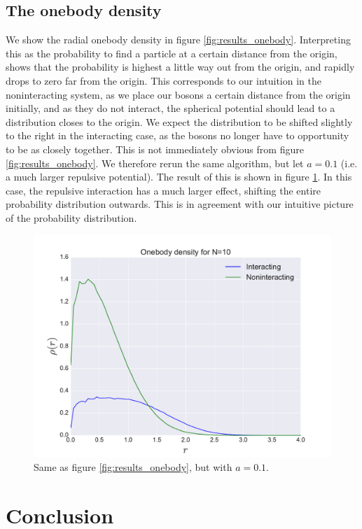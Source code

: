 \documentclass[a4paper, 10pt]{article}
\begin{document}
	 \subsection{The onebody density}\label{sec:Disc_onebody}
	 We show the radial onebody density in figure \ref{fig:results_onebody}. Interpreting this as the probability to find a particle at a certain distance from the origin, shows that the probability is highest a little way out from the origin, and rapidly drops to zero far from the origin. This corresponds to our intuition in the noninteracting system, as we place our bosons a certain distance from the origin initially, and as they do not interact, the spherical potential should lead to a distribution closes to the origin. We expect the distribution to be shifted slightly to the right in the interacting case, as the bosons no longer have to opportunity to be as closely together. This is not immediately obvious from figure \ref{fig:results_onebody}. We therefore rerun the same algorithm, but let $a=0.1$ (i.e. a much larger repulsive potential). The result of this is shown in figure \ref{fig:disc_onebody}. In this case, the repulsive interaction has a much larger effect, shifting the entire probability distribution outwards. This is in agreement with our intuitive picture of the probability distribution.
	 \begin{figure}[ht!]
	 	\centering
	 	\includegraphics[scale=0.8]{../Results/onbodyHighAlpha.pdf}
	 	\caption{Same as figure \ref{fig:results_onebody}, but with $a=0.1$.}\label{fig:disc_onebody}
	 \end{figure}
	 \pagebreak
	 \section{Conclusion}
\end{document}
